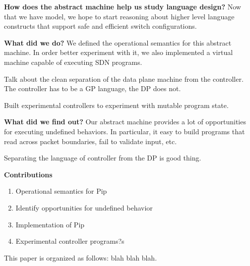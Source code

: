 \textbf{How does the abstract machine help us study language design?}
Now that we have model, we hope to start reasoning about higher level language constructs that support safe and efficient switch configurations. 

\textbf{What did we do?}
We defined the operational semantics for this abstract machine. In order better experiment with it, we also implemented a virtual machine capable of executing SDN programs.

Talk about the clean separation of the data plane machine from the controller.
The controller has to be a GP language, the DP does not.

Built experimental controllers to experiment with mutable program state.

\textbf{What did we find out?}
Our abstract machine provides a lot of opportunities for executing undefined behaviors. In particular, it easy to build programs that read across packet boundaries, fail to validate input, etc.

Separating the language of controller from the DP is good thing.

\textbf{Contributions}
\begin{enumerate}
\item Operational semantics for Pip
\item Identify opportunities for undefined behavior
\item Implementation of Pip
\item Experimental controller programs?s
\end{enumerate}


This paper is organized as follows: blah blah blah.
